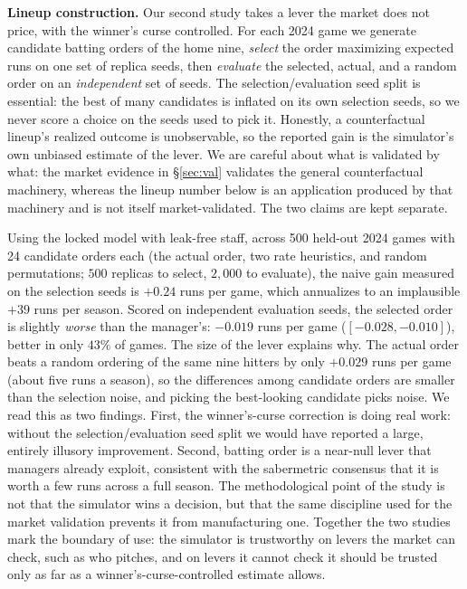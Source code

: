 \documentclass[10pt,twocolumn]{article}
\begin{document}
\textbf{Lineup construction.} Our second study takes a lever the market does not price, with the
winner's curse controlled. For each 2024 game we generate candidate batting orders of the home nine,
\emph{select} the order maximizing expected runs on one set of replica seeds, then \emph{evaluate} the
selected, actual, and a random order on an \emph{independent} set of seeds. The selection/evaluation
seed split is essential: the best of many candidates is inflated on its own selection seeds, so we never
score a choice on the seeds used to pick it. Honestly, a counterfactual lineup's realized outcome is
unobservable, so the reported gain is the simulator's own unbiased estimate of the lever. We are careful
about what is validated by what: the market evidence in \S\ref{sec:val} validates the general
counterfactual machinery, whereas the lineup number below is an application produced by that machinery
and is not itself market-validated. The two claims are kept separate.

Using the locked model with leak-free staff, across 500 held-out 2024 games with 24 candidate orders each
(the actual order, two rate heuristics, and random permutations; $500$ replicas to select, $2{,}000$ to
evaluate), the naive gain measured on the selection seeds is $+0.24$ runs per game, which annualizes
to an implausible $+39$ runs per season. Scored on independent evaluation seeds, the selected order is
slightly \emph{worse} than the manager's: $-0.019$ runs per game ($[-0.028,-0.010]$), better in only
$43\%$ of games. The size of the lever explains why. The actual order beats a random ordering of the
same nine hitters by only $+0.029$ runs per game (about five runs a season), so the differences among
candidate orders are smaller than the selection noise, and picking the best-looking candidate picks
noise. We read this as two findings. First, the winner's-curse correction is doing real work: without
the selection/evaluation seed split we would have reported a large, entirely illusory improvement.
Second, batting order is a near-null lever that managers already exploit, consistent with the
sabermetric consensus that it is worth a few runs across a full season. The methodological point of
the study is not that the simulator wins a decision, but that the same discipline used for the market
validation prevents it from manufacturing one. Together the two studies mark the boundary of use: the
simulator is trustworthy on levers the market can check, such as who pitches, and on levers it cannot
check it should be trusted only as far as a winner's-curse-controlled estimate allows.
\end{document}
